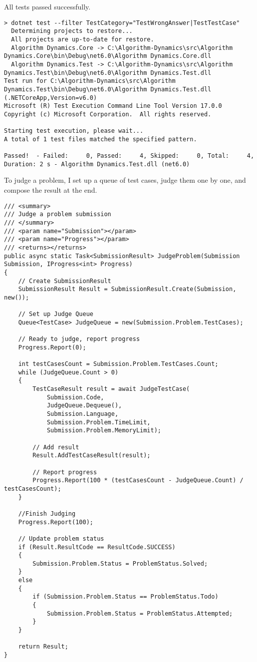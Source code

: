 \documentclass[report.tex]{subfiles}
\begin{document}
All tests passed successfully.

\begin{verbatim}
> dotnet test --filter TestCategory="TestWrongAnswer|TestTestCase"
  Determining projects to restore...
  All projects are up-to-date for restore.
  Algorithm Dynamics.Core -> C:\Algorithm-Dynamics\src\Algorithm Dynamics.Core\bin\Debug\net6.0\Algorithm Dynamics.Core.dll
  Algorithm Dynamics.Test -> C:\Algorithm-Dynamics\src\Algorithm Dynamics.Test\bin\Debug\net6.0\Algorithm Dynamics.Test.dll
Test run for C:\Algorithm-Dynamics\src\Algorithm Dynamics.Test\bin\Debug\net6.0\Algorithm Dynamics.Test.dll (.NETCoreApp,Version=v6.0)
Microsoft (R) Test Execution Command Line Tool Version 17.0.0
Copyright (c) Microsoft Corporation.  All rights reserved.

Starting test execution, please wait...
A total of 1 test files matched the specified pattern.

Passed!  - Failed:     0, Passed:     4, Skipped:     0, Total:     4, Duration: 2 s - Algorithm Dynamics.Test.dll (net6.0)
\end{verbatim}

To judge a problem, I set up a queue of test cases, judge them one by one, and compose the result at the end.

\begin{verbatim}
/// <summary>
/// Judge a problem submission
/// </summary>
/// <param name="Submission"></param>
/// <param name="Progress"></param>
/// <returns></returns>
public async static Task<SubmissionResult> JudgeProblem(Submission Submission, IProgress<int> Progress)
{
    // Create SubmissionResult
    SubmissionResult Result = SubmissionResult.Create(Submission, new());

    // Set up Judge Queue
    Queue<TestCase> JudgeQueue = new(Submission.Problem.TestCases);

    // Ready to judge, report progress
    Progress.Report(0);

    int testCasesCount = Submission.Problem.TestCases.Count;
    while (JudgeQueue.Count > 0)
    {
        TestCaseResult result = await JudgeTestCase(
            Submission.Code,
            JudgeQueue.Dequeue(),
            Submission.Language,
            Submission.Problem.TimeLimit,
            Submission.Problem.MemoryLimit);

        // Add result
        Result.AddTestCaseResult(result);

        // Report progress
        Progress.Report(100 * (testCasesCount - JudgeQueue.Count) / testCasesCount);
    }

    //Finish Judging
    Progress.Report(100);

    // Update problem status
    if (Result.ResultCode == ResultCode.SUCCESS)
    {
        Submission.Problem.Status = ProblemStatus.Solved;
    }
    else
    {
        if (Submission.Problem.Status == ProblemStatus.Todo)
        {
            Submission.Problem.Status = ProblemStatus.Attempted;
        }
    }

    return Result;
}
\end{verbatim}
\end{document}

